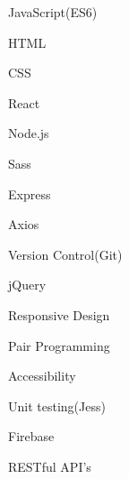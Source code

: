 

\begin{cventries}

  \cventry
    {} %
    {} %
    {} %
    {} %
    {
        \begin{minipage}[t]{.3\linewidth}
            \begin{cvitems}
                \item {JavaScript(ES6)}
                \item {HTML}
                \item {CSS}
                \item {React} 
                \item {Node.js}
            \end{cvitems}
        \end{minipage}%
        \begin{minipage}[t]{.3\linewidth}
            \begin{cvitems}
                \item {Sass}
                \item {Express}
                \item {Axios}
                \item {Version Control(Git)}
                \item {jQuery}
            \end{cvitems}
        \end{minipage}%
        \begin{minipage}[t]{.3\linewidth}
            \begin{cvitems}
                 \item {Responsive Design}
                \item {Pair Programming} 
                 \item {Accessibility}
                \item {Unit testing(Jess)}
                \item {Firebase}
                \item {RESTful API's} 
            \end{cvitems}
        \end{minipage}
    }

\end{cventries}
